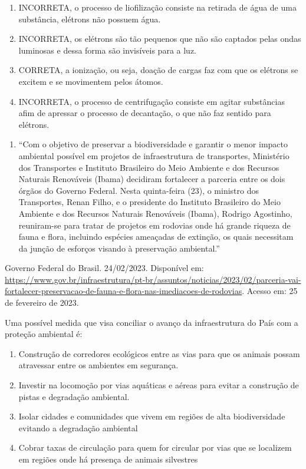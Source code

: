 \begin{enumerate}
\def\labelenumi{(\Alph{enumi})}
\item
  INCORRETA, o processo de liofilização consiste na retirada de água de
  uma substância, elétrons não possuem água.
\item
  INCORRETA, os elétrons são tão pequenos que não são captados pelas
  ondas luminosas e dessa forma são invisíveis para a luz.
\item
  CORRETA, a ionização, ou seja, doação de cargas faz com que os
  elétrons se excitem e se movimentem pelos átomos.
\item
  INCORRETA, o processo de centrifugação consiste em agitar substâncias
  afim de apressar o processo de decantação, o que não faz sentido para
  elétrons.
\end{enumerate}

\begin{enumerate}
\def\labelenumi{\arabic{enumi})}
\item
  ``Com o objetivo de preservar a biodiversidade e garantir o menor
  impacto ambiental possível em projetos de infraestrutura de
  transportes, Ministério dos Transportes e Instituto Brasileiro do Meio
  Ambiente e dos Recursos Naturais Renováveis (Ibama) decidiram
  fortalecer a parceria entre os dois órgãos do Governo Federal. Nesta
  quinta-feira (23), o ministro dos Transportes, Renan Filho, e o
  presidente do Instituto Brasileiro do Meio Ambiente e dos Recursos
  Naturais Renováveis (Ibama), Rodrigo Agostinho, reuniram-se para
  tratar de projetos em rodovias onde há grande riqueza de fauna e
  flora, incluindo espécies ameaçadas de extinção, os quais necessitam
  da junção de esforços visando à preservação ambiental.''
\end{enumerate}

Governo Federal do Brasil. 24/02/2023. Disponível em:
\url{https://www.gov.br/infraestrutura/pt-br/assuntos/noticias/2023/02/parceria-vai-fortalecer-preservacao-de-fauna-e-flora-nas-imediacoes-de-rodovias}.
Acesso em: 25 de fevereiro de 2023.

Uma possível medida que visa conciliar o avanço da infraestrutura do
País com a proteção ambiental é:

\begin{enumerate}
\def\labelenumi{(\Alph{enumi})}
\item
  Construção de corredores ecológicos entre as vias para que os animais
  possam atravessar entre os ambientes em segurança.
\item
  Investir na locomoção por vias aquáticas e aéreas para evitar a
  construção de pistas e degradação ambiental.
\item
  Isolar cidades e comunidades que vivem em regiões de alta
  biodiversidade evitando a degradação ambiental
\item
  Cobrar taxas de circulação para quem for circular por vias que se
  localizem em regiões onde há presença de animais silvestres
\end{enumerate}

